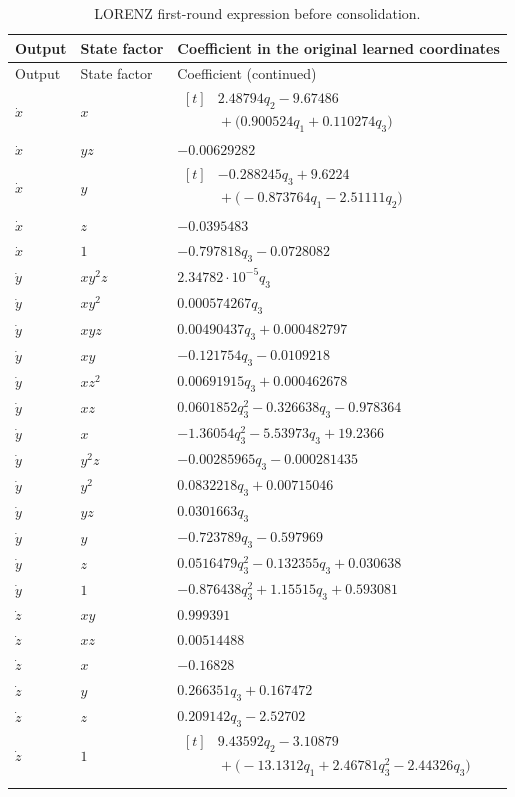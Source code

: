 \begin{longtable}{@{}p{1.2cm}p{2cm}p{11.5cm}@{}}
\caption{LORENZ first-round expression before consolidation.}\label{tab:raw_lorenz}\\
\toprule Output & State factor & Coefficient in the original learned coordinates\\\midrule\endfirsthead
\toprule Output & State factor & Coefficient (continued)\\\midrule\endhead
\bottomrule\endfoot
$\dot x$ & $x$ & $\begin{aligned}[t]&2.48794 q_{2} - 9.67486\\&{}+\bigl(0.900524 q_{1} + 0.110274 q_{3}\bigr)\end{aligned}$\\
$\dot x$ & $y z$ & $-0.00629282$\\
$\dot x$ & $y$ & $\begin{aligned}[t]&- 0.288245 q_{3} + 9.6224\\&{}+\bigl(- 0.873764 q_{1} - 2.51111 q_{2}\bigr)\end{aligned}$\\
$\dot x$ & $z$ & $-0.0395483$\\
$\dot x$ & $1$ & $- 0.797818 q_{3} - 0.0728082$\\
\addlinespace
$\dot y$ & $x y^{2} z$ & $2.34782 \cdot 10^{-5} q_{3}$\\
$\dot y$ & $x y^{2}$ & $0.000574267 q_{3}$\\
$\dot y$ & $x y z$ & $0.00490437 q_{3} + 0.000482797$\\
$\dot y$ & $x y$ & $- 0.121754 q_{3} - 0.0109218$\\
$\dot y$ & $x z^{2}$ & $0.00691915 q_{3} + 0.000462678$\\
$\dot y$ & $x z$ & $0.0601852 q_{3}^{2} - 0.326638 q_{3} - 0.978364$\\
$\dot y$ & $x$ & $- 1.36054 q_{3}^{2} - 5.53973 q_{3} + 19.2366$\\
$\dot y$ & $y^{2} z$ & $- 0.00285965 q_{3} - 0.000281435$\\
$\dot y$ & $y^{2}$ & $0.0832218 q_{3} + 0.00715046$\\
$\dot y$ & $y z$ & $0.0301663 q_{3}$\\
$\dot y$ & $y$ & $- 0.723789 q_{3} - 0.597969$\\
$\dot y$ & $z$ & $0.0516479 q_{3}^{2} - 0.132355 q_{3} + 0.030638$\\
$\dot y$ & $1$ & $- 0.876438 q_{3}^{2} + 1.15515 q_{3} + 0.593081$\\
\addlinespace
$\dot z$ & $x y$ & $0.999391$\\
$\dot z$ & $x z$ & $0.00514488$\\
$\dot z$ & $x$ & $-0.16828$\\
$\dot z$ & $y$ & $0.266351 q_{3} + 0.167472$\\
$\dot z$ & $z$ & $0.209142 q_{3} - 2.52702$\\
$\dot z$ & $1$ & $\begin{aligned}[t]&9.43592 q_{2} - 3.10879\\&{}+\bigl(- 13.1312 q_{1} + 2.46781 q_{3}^{2} - 2.44326 q_{3}\bigr)\end{aligned}$\\
\addlinespace
\end{longtable}

